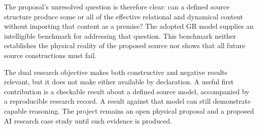 \documentclass[11pt,oneside]{report}
\newcommand{\ArticleShort}{}
\theoremstyle{remark}
\numberwithin{definition}{chapter}
\numberwithin{proposition}{chapter}
\numberwithin{remark}{chapter}
\begin{document}
The proposal's unresolved question is therefore clear: can a defined source structure produce some or all of the effective relational and dynamical content without importing that content as a premise? The adopted GR model supplies an intelligible benchmark for addressing that question. This benchmark neither establishes the physical reality of the proposed source nor shows that all future source constructions must fail.

The dual research objective makes both constructive and negative results relevant, but it does not make either available by declaration. A useful first contribution is a checkable result about a defined source model, accompanied by a reproducible research record. A result against that model can still demonstrate capable reasoning. The project remains an open physical proposal and a proposed AI research case study until such evidence is produced.

\clearpage
\renewcommand{\ArticleShort}{References}
\printbibliography[heading=bibintoc,title={References}]
\end{document}
